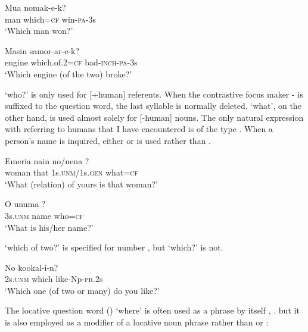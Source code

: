 \ea%
\label{ex:3:x525}
\gll Mua  nomak-e-k? \\
man which=\textsc{cf} win-\textsc{pa}-3s\\
\glt`Which man won?'
\z

\ea%
\label{ex:3:x526}
\gll Masin  samor-ar-e-k? \\
engine which.of.2=\textsc{cf} bad-\textsc{inch}-\textsc{pa}-3s\\
\glt`Which engine (of the two) broke?'
\z

 `who?' is only used for [+human] referents. When the contrastive focus maker - is suffixed to the question word, the last syllable is normally deleted.  `what', on the other hand, is used almost solely for [-human] nouns. The only natural expression with  referring to humans that I have encountered is of the type . When a person's name is inquired, either   or   is used rather than .

\ea%
\label{ex:3:x649}
\gll Emeria nain no/nena ? \\
woman that 1s.\textsc{unm}/1s.\textsc{gen} what=\textsc{cf}\\
\glt`What (relation) of yours is that woman?'
\z

\ea%
\label{ex:3:x1855}
\gll O unuma ? \\
3s.\textsc{unm} name who=\textsc{cf}\\
\glt`What is his/her name?'
\z

 `which of two?' is specified for number , but  `which?' is not.

\ea%
\label{ex:3:x691}
\gll No  kookal-i-n? \\
2s.\textsc{unm} which like-Np-\textsc{pr}.2s\\
\glt`Which one (of two or many) do you like?'
\z

The locative question word () `where' is often used as a phrase by itself , . but it is also employed as a modifier of a locative noun phrase rather than  or : 

